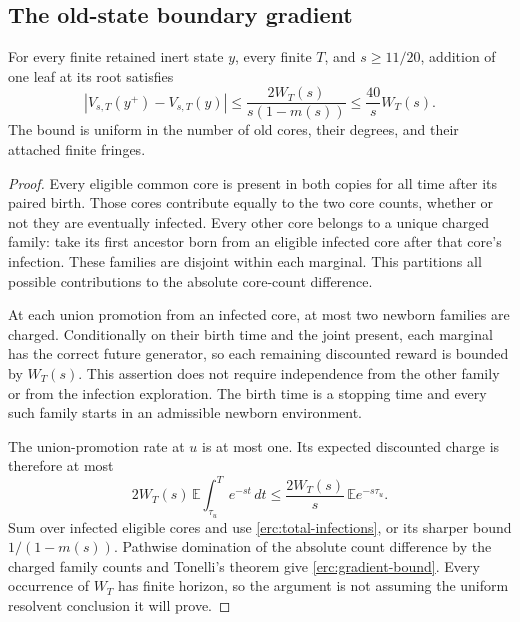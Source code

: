 \subsection{The old-state boundary gradient}

\begin{theorem}
\label{erc:gradient}
For every finite retained inert state $y$, every finite $T$, and
$s\ge11/20$, addition of one leaf at its root satisfies
\begin{equation}\label{erc:gradient-bound}
 \boxed{
 |V_{s,T}(y^+)-V_{s,T}(y)|
 \le\frac{2W_T(s)}{s(1-m(s))}
 \le\frac{40}{s}W_T(s).
 }
\end{equation}
The bound is uniform in the number of old cores, their degrees, and
their attached finite fringes.
\end{theorem}
\begin{proof}
Every eligible common core is present in both copies for all time
after its paired birth.  Those cores contribute equally to the two
core counts, whether or not they are eventually infected.  Every other
core belongs to a unique charged family: take its first ancestor born
from an eligible infected core after that core's infection.  These
families are disjoint within each marginal.  This partitions all
possible contributions to the absolute core-count difference.

At each union promotion from an infected core, at most two newborn
families are charged.  Conditionally on their birth time and the joint
present, each marginal has the correct future generator, so each
remaining discounted reward is bounded by $W_T(s)$.  This assertion
does not require independence from the other family or from the
infection exploration.  The birth time is a stopping time and every
such family starts in an admissible newborn environment.

The union-promotion rate at $u$ is at most one.  Its expected discounted
charge is therefore at most
\[
 2W_T(s)\,\mathbb E\int_{\tau_u}^T e^{-st}\,dt
 \le\frac{2W_T(s)}s\,\mathbb E e^{-s\tau_u}.
\]
Sum over infected eligible cores and use
\eqref{erc:total-infections}, or its sharper bound $1/(1-m(s))$.
Pathwise domination of the absolute count difference by the charged
family counts and Tonelli's theorem give \eqref{erc:gradient-bound}.
Every occurrence of $W_T$ has finite horizon, so the argument is not
assuming the uniform resolvent conclusion it will prove.
\end{proof}

